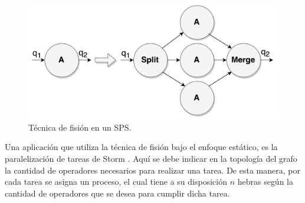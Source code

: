 \begin{figure}[!ht]
	\centering
	\includegraphics[scale=0.4]{images/Fision.pdf}
	\caption{Técnica de fisión en un SPS.}
	\label{fig:fision}
\end{figure}



Una aplicación que utiliza la técnica de fisión bajo el enfoque estático, es la paralelización de tareas de Storm \citep{bookstorm}. Aquí se debe indicar en la topología del grafo la cantidad de operadores necesarios para realizar una tarea. De esta manera, por cada tarea se asigna un proceso, el cual tiene a su disposición $n$ hebras según la cantidad de operadores que se desea para cumplir dicha tarea.

